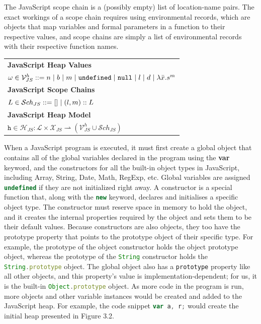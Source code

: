 \documentclass[a4paper,11pt,twoside]{report}
\def\jsinline{\lstinline[language=JavaScript, basicstyle=\small]}%\end{lstlisting}
\begin{document}
The JavaScript scope chain is a (possibly empty) list of location-name pairs. The exact workings of a scope chain requires using environmental records, which are objects that map variables and formal parameters in a function to their respective values, and scope chains are simply a list of environmental records with their respective function names.

\begin{center}
\begin{tabular}{p{10cm}} 
\textbf{JavaScript Heap Values} \\
$\omega \in \mathcal{V}_{JS}^{h} ::= n \hspace{3pt}|\hspace{3pt} b \hspace{3pt}|\hspace{3pt} m \hspace{3pt}|\hspace{3pt} \mathtt{undefined} \hspace{3pt}|\hspace{3pt} \mathtt{null} \hspace{3pt}|\hspace{3pt} l \hspace{3pt}|\hspace{3pt} d \hspace{3pt}|\hspace{3pt} \lambda \bar{x}.s^m $  \\[0.3cm]

\textbf{JavaScript Scope Chains} \\
$L \in \mathcal{S}ch_{JS} ::= [ ] \hspace{3pt}|\hspace{3pt} (l, m) :: L $  \\[0.3cm]

\textbf{JavaScript Heap Model} \\
$\texttt{h} \in \mathcal{H}_{JS} : \mathcal{L} \times \mathcal{X}_{JS} \rightharpoonup (\mathcal{V}_{JS}^h \cup \mathcal{S}ch_{JS})$  \\ 
\end{tabular}
\end{center}

When a JavaScript program is executed, it must first create a global object that contains all of the global variables declared in the program using the \textbf{var} keyword, and the constructors for all the built-in object types in JavaScript, including Array, String, Date, Math, RegExp, etc. Global variables are assigned \jsinline|undefined| if they are not initialized right away. A constructor is a special function that, along with the \jsinline|new| keyword, declares and initialises a specific object type. The constructor must reserve space in memory to hold the object, and it creates the internal properties required by the object and sets them to be their default values. Because constructors are also objects, they too have the prototype property that points to the prototype object of their specific type. For example, the prototype of the object constructor holds the object prototype object, whereas the prototype of the \jsinline|String| constructor holds the \jsinline|String.prototype| object. The global object also has a \jsinline|prototype| property like all other objects, and this property's value is implementation-dependent; for us, it is the built-in \jsinline|Object.prototype| object. As more code in the program is run, more objects and other variable instances would be created and added to the JavaScript heap. For example, the code snippet \jsinline|var a, r;| would create the initial heap presented in Figure 3.2.
\end{document}
